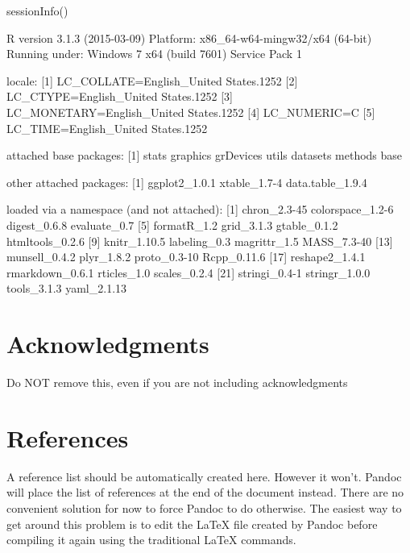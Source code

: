 \documentclass[10pt]{article}
\newenvironment{CodeChunk}{}{}
\begin{document}
\begin{CodeChunk}
\begin{CodeInput}
sessionInfo()
\end{CodeInput}
\begin{CodeOutput}
R version 3.1.3 (2015-03-09)
Platform: x86_64-w64-mingw32/x64 (64-bit)
Running under: Windows 7 x64 (build 7601) Service Pack 1

locale:
[1] LC_COLLATE=English_United States.1252 
[2] LC_CTYPE=English_United States.1252   
[3] LC_MONETARY=English_United States.1252
[4] LC_NUMERIC=C                          
[5] LC_TIME=English_United States.1252    

attached base packages:
[1] stats     graphics  grDevices utils     datasets  methods   base     

other attached packages:
[1] ggplot2_1.0.1    xtable_1.7-4     data.table_1.9.4

loaded via a namespace (and not attached):
 [1] chron_2.3-45     colorspace_1.2-6 digest_0.6.8     evaluate_0.7    
 [5] formatR_1.2      grid_3.1.3       gtable_0.1.2     htmltools_0.2.6 
 [9] knitr_1.10.5     labeling_0.3     magrittr_1.5     MASS_7.3-40     
[13] munsell_0.4.2    plyr_1.8.2       proto_0.3-10     Rcpp_0.11.6     
[17] reshape2_1.4.1   rmarkdown_0.6.1  rticles_1.0      scales_0.2.4    
[21] stringi_0.4-1    stringr_1.0.0    tools_3.1.3      yaml_2.1.13     
\end{CodeOutput}
\end{CodeChunk}

\section*{Acknowledgments}\label{acknowledgments}

Do NOT remove this, even if you are not including acknowledgments

\section*{References}\label{references}

A reference list should be automatically created here. However it won't.
Pandoc will place the list of references at the end of the document
instead. There are no convenient solution for now to force Pandoc to do
otherwise. The easiest way to get around this problem is to edit the
LaTeX file created by Pandoc before compiling it again using the
traditional LaTeX commands.
\end{document}
